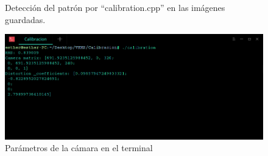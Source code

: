 \begin{figure}[htbp]
\caption{Detección del patrón por ``calibration.cpp'' en las imágenes guardadas.} 
\label{fig: patrondetectado}
\end{figure}

    \begin{figure}[H]
    \centering
    \includegraphics[scale = 0.5]{capitulo_04/figuras_dir/parametros.jpg}
    \caption{Parámetros de la cámara en el terminal}
    \label{fig: parametroscamaraterminal}
    \end{figure}


